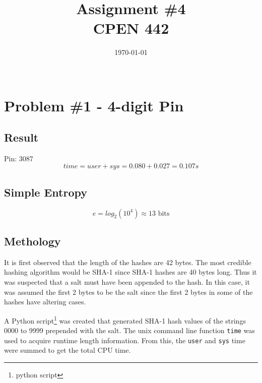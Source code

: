 \documentclass[conference]{IEEEtran}
\begin{document}
\title{Assignment \#4\\
\Large{CPEN 442\\}}


\author{
  \today\\\\
}


\maketitle


\section{Problem \#1 - 4-digit Pin}

\subsection{Result}
  \noindent Pin: 3087
  \begin{displaymath}
  time = user + sys = 0.080 + 0.027 = 0.107s
  \end{displaymath}

\subsection{Simple Entropy}
  \begin{displaymath}
    e = log_2(10^4) \approx 13 \mbox{ bits}
  \end{displaymath}

\subsection{Methology}
It is first observed that the length of the hashes are 42 bytes. The most
credible hashing algorithm would be SHA-1 since SHA-1 hashes are 40 bytes long.
Thus it was suspected that a salt must have been appended to the hash. In this
case, it was assumed the first 2 bytes to be the salt since the first 2 bytes in
some of the hashes have altering cases.

A Python script\footnote{python script} was created that generated SHA-1 hash
values of the strings 0000 to 9999 prepended with the salt. The unix command
line function \texttt{time} was used to acquire runtime length information. From
this, the \texttt{user} and \texttt{sys} time were summed to get the total CPU
time.
\end{document}
